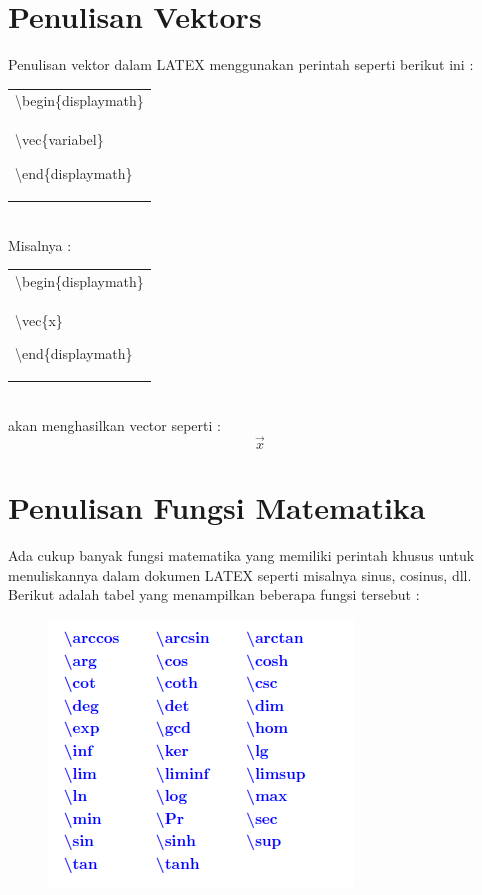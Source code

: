 \section{Penulisan  Vektors}
Penulisan vektor dalam LATEX menggunakan perintah seperti berikut ini :\\[0.5 cm]
\begin{tabular}{|p{13.5 cm}|}
\hline
\textbackslash begin\{displaymath\}\\
\textbackslash vec\{variabel\}

\textbackslash end\{displaymath\}\\
\hline
\end{tabular}\\[0.5 cm]
Misalnya :\\[0.5 cm]
\begin{tabular}{|p{13.5 cm}|}
\hline
\textbackslash begin\{displaymath\}\\
\textbackslash vec\{x\}

\textbackslash end\{displaymath\}\\
\hline
\end{tabular}\\[0.5 cm]
akan menghasilkan vector seperti :\\[0.5 cm]
\begin{displaymath}
\vec{x}
\end{displaymath}
\section{Penulisan Fungsi Matematika}
Ada cukup banyak fungsi matematika yang memiliki perintah khusus untuk menuliskannya
dalam dokumen LATEX seperti misalnya sinus, cosinus, dll. Berikut adalah  tabel yang
menampilkan beberapa fungsi tersebut :\\[0.5 cm]
\begin{figure}[h!]
\centering
\includegraphics[width=7 cm]{img/13.png}
\end{figure}
\newpage
